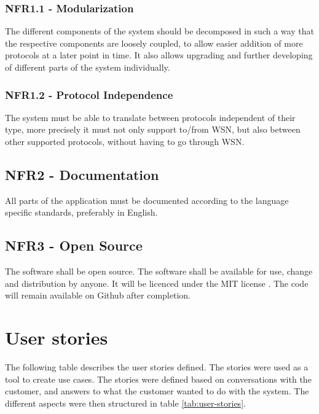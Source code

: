 \subsubsection{NFR1.1 - Modularization}
\label{subsec:requirements_engineering-non_functional_requirements-modularization}

The different components of the system should be decomposed in such a way that the respective components are loosely coupled, to allow easier addition of more protocols at a later point in time. It also allows upgrading and further developing of different parts of the system individually.

\subsubsection{NFR1.2 - Protocol Independence}
\label{subsec:requirements_engineering-non_functional_requirements-protocol_independence}

The system must be able to translate between protocols independent of their type, more precisely it must not only support to/from WSN, but also between other supported protocols, without having to go through WSN.

\subsection{NFR2 - Documentation}
\label{subsec:requirements_engineering-non_functional_requirements-documentation}

All parts of the application must be documented according to the language specific standards, preferably in English.

\subsection{NFR3 - Open Source}
\label{subsec:requirements_engineering-non_functional_requirements-open_source}

The software shall be open source. The software shall be available for use, change and distribution by anyone. It will be licenced under the MIT license \cite{mit-license}. The code will remain available on Github after completion.

\section{User stories}
\label{sec:requirements_engineering-user_stories}

The following table describes the user stories defined. The stories were used as a tool to create use cases. The stories were defined based on conversations with the customer, and answers to what the customer wanted to do with the system. The different aspects were then structured in table \ref{tab:user-stories}. 

